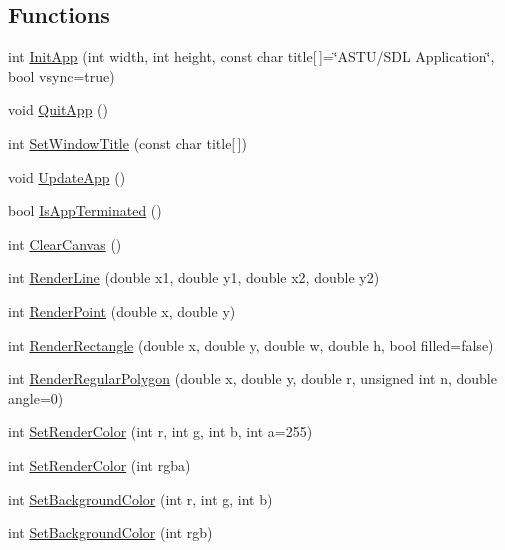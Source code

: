\subsection*{Functions}
\begin{DoxyCompactItemize}
\item 
int \hyperlink{group__sdl__group_ga8f43e7993cf196bb0af33a60bc93aa75}{Init\+App} (int width, int height, const char title\mbox{[}$\,$\mbox{]}=\char`\"{}A\+S\+TU/S\+DL Application\char`\"{}, bool vsync=true)
\item 
void \hyperlink{group__sdl__group_gaf4cba1685a7c46bccc7bbdf863114cee}{Quit\+App} ()
\item 
int \hyperlink{group__sdl__group_ga6dfd8bbc85eeeee6922576be9ae65e29}{Set\+Window\+Title} (const char title\mbox{[}$\,$\mbox{]})
\item 
void \hyperlink{group__sdl__group_ga9bf9bfe01e7d336c3a3b13cc923ff850}{Update\+App} ()
\item 
bool \hyperlink{group__sdl__group_ga6d29aa641d22a0299da4710022c8c96b}{Is\+App\+Terminated} ()
\item 
int \hyperlink{group__sdl__group_ga4cc0ada571b47d2b809d441fa6766b52}{Clear\+Canvas} ()
\item 
int \hyperlink{group__sdl__group_gade420aec0a7492d5ac5f320b1ff4a814}{Render\+Line} (double x1, double y1, double x2, double y2)
\item 
int \hyperlink{group__sdl__group_gadd510400a2614b9b8fd8afbe368fc795}{Render\+Point} (double x, double y)
\item 
int \hyperlink{group__sdl__group_gaa5b815a9fcac2b1be46a5957bdbfd13f}{Render\+Rectangle} (double x, double y, double w, double h, bool filled=false)
\item 
int \hyperlink{group__sdl__group_ga639ecb3c5d86733ee9b38dcdf49c723f}{Render\+Regular\+Polygon} (double x, double y, double r, unsigned int n, double angle=0)
\item 
int \hyperlink{group__sdl__group_gab01fa8f79d94269a5b9a1cb7d2e51843}{Set\+Render\+Color} (int r, int g, int b, int a=255)
\item 
int \hyperlink{group__sdl__group_gaa5ac5769b86fd14f41fc2421e8e029bc}{Set\+Render\+Color} (int rgba)
\item 
int \hyperlink{group__sdl__group_ga540012b7df5eddd0b109543deaa66a22}{Set\+Background\+Color} (int r, int g, int b)
\item 
int \hyperlink{group__sdl__group_gaa80de83a7c03984305662ae0ca5daa05}{Set\+Background\+Color} (int rgb)
\item 

\end{DoxyCompactItemize}
